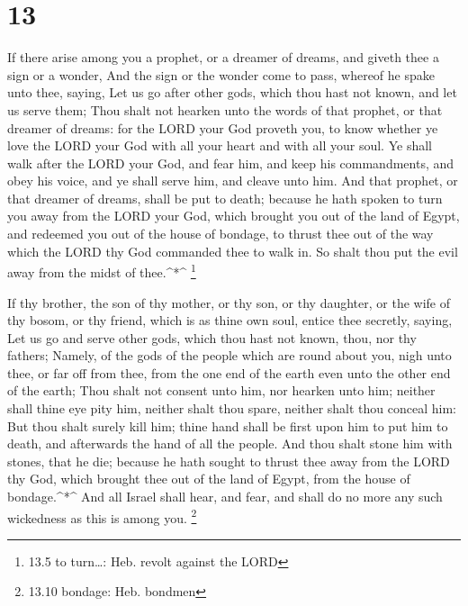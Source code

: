 \hypertarget{section-12}{%
\section{13}\label{section-12}}

 If there arise among you a prophet, or a dreamer of dreams,
and giveth thee a sign or a wonder,  And the sign or the
wonder come to pass, whereof he spake unto thee, saying, Let us go after
other gods, which thou hast not known, and let us serve them;
 Thou shalt not hearken unto the words of that prophet, or
that dreamer of dreams: for the LORD your God proveth you, to know
whether ye love the LORD your God with all your heart and with all your
soul.  Ye shall walk after the LORD your God, and fear him,
and keep his commandments, and obey his voice, and ye shall serve him,
and cleave unto him.  And that prophet, or that dreamer of
dreams, shall be put to death; because he hath spoken to turn you away
from the LORD your God, which brought you out of the land of Egypt, and
redeemed you out of the house of bondage, to thrust thee out of the way
which the LORD thy God commanded thee to walk in. So shalt thou put the
evil away from the midst of thee.\^{}*\^{} \footnote{13.5 to turn\ldots:
  Heb. revolt against the LORD}

 If thy brother, the son of thy mother, or thy son, or thy
daughter, or the wife of thy bosom, or thy friend, which is as thine own
soul, entice thee secretly, saying, Let us go and serve other gods,
which thou hast not known, thou, nor thy fathers;  Namely,
of the gods of the people which are round about you, nigh unto thee, or
far off from thee, from the one end of the earth even unto the other end
of the earth;  Thou shalt not consent unto him, nor hearken
unto him; neither shall thine eye pity him, neither shalt thou spare,
neither shalt thou conceal him:  But thou shalt surely kill
him; thine hand shall be first upon him to put him to death, and
afterwards the hand of all the people.  And thou shalt
stone him with stones, that he die; because he hath sought to thrust
thee away from the LORD thy God, which brought thee out of the land of
Egypt, from the house of bondage.\^{}*\^{}  And all Israel
shall hear, and fear, and shall do no more any such wickedness as this
is among you. \footnote{13.10 bondage: Heb. bondmen}

